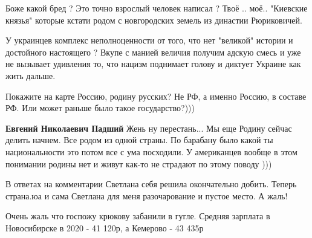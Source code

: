 \begin{itemize}
Боже какой бред ? Это точно взрослый человек написал ? Твоё .. моё.. "Киевские
князья" которые кстати родом с новгородских земель из династии Рюриковичей.

У украинцев комплекс неполноценности от того, что нет "великой" истории и
достойного настоящего ? Вкупе с манией величия получим адскую смесь и уже не
вызывает удивления то, что нацизм поднимает голову и диктует Украине как жить
дальше.

\begin{itemize}
 
Покажите на карте Россию, родину русских? Не РФ, а именно Россию, в составе РФ. Или может раньше было такое государство?)))

 
\textbf{Евгений Николаевич Падший} Жень ну перестань... Мы еще Родину сейчас делить начнем. Все родом из одной страны. По барабану было какой ты национальности это потом все с ума посходили. У американцев вообще в этом понимании родины нет и живут как-то не страдают по этому поводу )))
\end{itemize}

 
В ответах на комментарии Светлана себя решила окончательно добить. Теперь страна.юа и сама Светлана для меня разочарование и пустое место. А жаль!

 
Очень жаль что госпожу крюкову забанили в гугле. Средняя зарплата в Новосибирске в 2020 - 41 120р, а Кемерово - 43 435р

 

\end{itemize}
